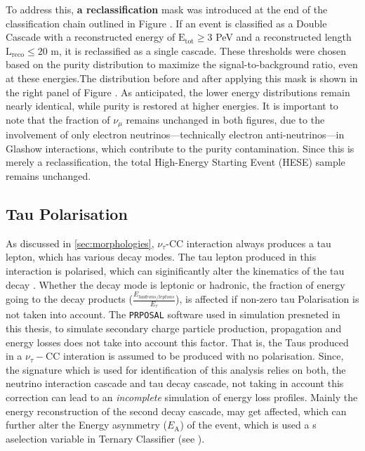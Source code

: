 To address this, \textbf{a reclassification} mask was introduced at the end of the classification chain outlined in Figure . If an event is classified as a Double Cascade with a reconstructed energy of \(\mathrm{E}_{\mathrm{tot}} \geq 3\) PeV and a reconstructed length \(\mathrm{L}_{\mathrm{reco}} \leq 20\) m, it is reclassified as a single cascade. These thresholds were chosen based on the purity distribution to maximize the signal-to-background ratio, even at these energies.The distribution before and after applying this mask is shown in the right panel of Figure . As anticipated, the lower energy distributions remain nearly identical, while purity is restored at higher energies. It is important to note that the fraction of \(\nu_{\mu}\) remains unchanged in both figures, due to the involvement of only electron neutrinos—technically electron anti-neutrinos—in Glashow interactions, which contribute to the purity contamination. Since this is merely a reclassification, the total High-Energy Starting Event (HESE) sample remains unchanged.
 

\subsection{Tau Polarisation}
\label{sec:tau_polarisation}
As discussed in \ref{sec:morphologies}, $\nu_{\tau}$-CC interaction always produces a tau lepton, which has various decay modes. The tau lepton produced in this interaction is polarised, which can siginificantly alter the kinematics of the tau decay . Whether the decay mode is leptonic or hadronic, the fraction of energy going to the decay products ($\frac{E_{hadrons/leptons}}{E_{\tau}}$), is affected if non-zero tau Polarisation is not taken into account. The \texttt{PRPOSAL} software used in simulation presneted in this thesis, to simulate secondary charge particle production, propagation and energy losses does not take into account this factor. That is, the Taus produced in a $\nu_{\tau}-$CC interation is assumed to be produced with no polarisation. Since, the signature which is used for identification of this analysis relies on both, the neutrino interaction cascade and tau decay cascade, not taking in account this correction can lead to an \emph{incomplete} simulation of energy loss profiles. Mainly the energy reconstruction of the second decay cascade, may get affected, which can further alter the Energy asymmetry ($E_{\mathrm{A}}$) of the event, which is used a s aselection variable in Ternary Classifier (see ). 

